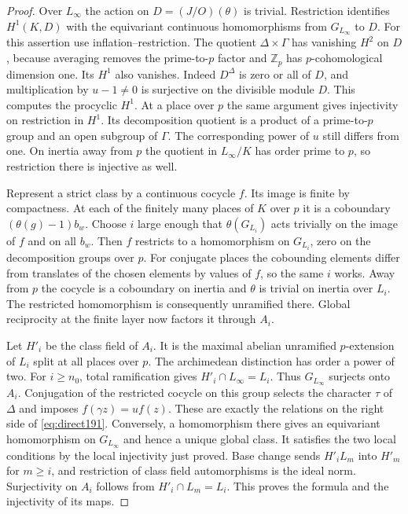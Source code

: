 \documentclass[a4paper,11pt]{article}
\theoremstyle{definition}
\theoremstyle{remark}
\newcommand{\ZZ}{\mathbb Z}\newcommand{\ord}{\operatorname{ord}}
\numberwithin{equation}{section}
\begin{document}
\begin{proof}
Over \(L_\infty\) the action on \(D=(J/O)(\theta)\) is trivial.
Restriction identifies \(H^1(K,D)\) with the equivariant continuous
homomorphisms from \(G_{L_\infty}\) to \(D\). For this assertion
use inflation--restriction. The quotient \(\Delta\times\Gamma\)
has vanishing \(H^2\) on \(D\), because averaging removes the
prime-to-\(p\) factor and \(\ZZ_p\) has \(p\)-cohomological dimension
one. Its \(H^1\) also vanishes. Indeed \(D^\Delta\) is zero or
all of \(D\), and multiplication by \(u-1\ne0\) is surjective on
the divisible module \(D\). This computes the procyclic \(H^1\).
At a place over \(p\) the same argument gives injectivity on
restriction in \(H^1\). Its decomposition quotient is a product
of a prime-to-\(p\) group and an open subgroup of \(\Gamma\).
The corresponding power of \(u\) still differs from one. On inertia
away from \(p\) the quotient in \(L_\infty/K\) has order prime to
\(p\), so restriction there is injective as well.

Represent a strict class by a continuous cocycle \(f\). Its image
is finite by compactness. At each of the finitely many places of
\(K\) over \(p\) it is a coboundary \((\theta(g)-1)b_w\).
Choose \(i\) large enough that \(\theta(G_{L_i})\) acts trivially
on the image of \(f\) and on all \(b_w\). Then \(f\) restricts to a
homomorphism on \(G_{L_i}\), zero on the decomposition groups
over \(p\). For conjugate places the cobounding elements differ
from translates of the chosen elements by values of \(f\), so the
same \(i\) works. Away from \(p\) the cocycle is a coboundary on
inertia and \(\theta\) is trivial on inertia over \(L_i\).
The restricted homomorphism is consequently unramified there.
Global reciprocity at the finite layer now factors it through
\(A_i\).~\cite{V-III-V-cft101}

Let \(H'_i\) be the class field of \(A_i\). It is the maximal
abelian unramified \(p\)-extension of \(L_i\) split at all places
over \(p\). The archimedean distinction has order a power of two.
For \(i\ge n_0\), total ramification gives
\(H'_i\cap L_\infty=L_i\). Thus \(G_{L_\infty}\) surjects onto
\(A_i\). Conjugation of the restricted cocycle on this group
selects the character \(\tau\) of \(\Delta\) and imposes
\(f(\gamma z)=u f(z)\). These are exactly the relations on the
right side of \eqref{eq:direct191}. Conversely, a homomorphism
there gives an equivariant homomorphism on \(G_{L_\infty}\) and
hence a unique global class. It satisfies the two local conditions
by the local injectivity just proved. Base change sends
\(H'_i L_m\) into \(H'_m\) for \(m\ge i\), and restriction of class
field automorphisms is the ideal norm. Surjectivity on \(A_i\)
follows from \(H'_i\cap L_m=L_i\). This proves the formula and
the injectivity of its maps.
\end{proof}
\end{document}
